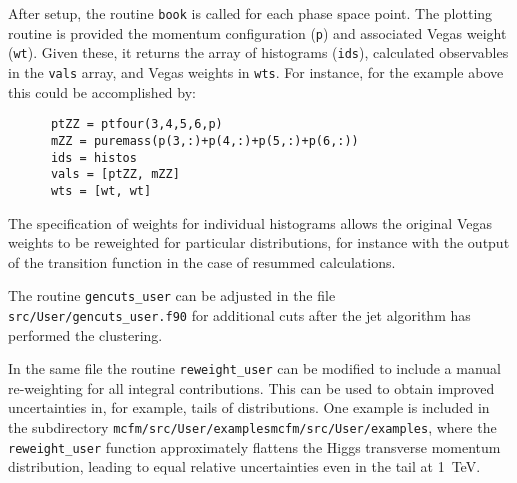 After setup, the routine {\tt book} is called for each phase space
point.  The plotting routine is provided the momentum configuration ({\tt p})
and associated Vegas weight ({\tt wt}).  Given these, it returns the array of
histograms ({\tt ids}), calculated observables in the
{\tt vals} array, and Vegas weights in {\tt wts}.
For instance, for the example above this could be accomplished by:
\begin{verbatim}
      ptZZ = ptfour(3,4,5,6,p)
      mZZ = puremass(p(3,:)+p(4,:)+p(5,:)+p(6,:))
      ids = histos
      vals = [ptZZ, mZZ]
      wts = [wt, wt]
\end{verbatim}
The specification of weights for individual histograms allows 
the original Vegas weights to be reweighted for particular distributions,
for instance with the output of the transition function in the case of
resummed calculations.


The routine \texttt{gencuts\_user} can be adjusted  in 
the file
\texttt{src/User/gencuts\_user.f90} for additional cuts after the jet algorithm has performed the 
clustering.

In the same file the routine \texttt{reweight\_user} can be modified to include a manual re-weighting
for all integral contributions. This can be used to obtain improved uncertainties in, for example, tails of 
distributions.
One example is included in the subdirectory \texttt{mcfm/src/User/examplesmcfm/src/User/examples}, where the \texttt{reweight\_user} function approximately
flattens the Higgs transverse momentum distribution, leading to equal relative uncertainties even in the tail at 
1~TeV.
